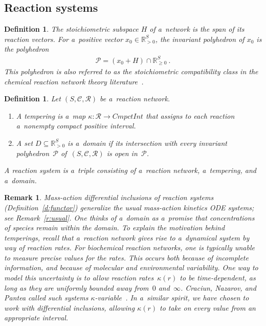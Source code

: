 \documentclass[pdftex]{sigma}
\newtheorem{Definition}[Theorem]{Definition}
\newtheorem{Remark}[Theorem]{Remark}
\begin{document}
\subsection{Reaction systems}
\label{sub:systems}
\begin{Definition}
\label{d:stoichiometry}
The \emph{stoichiometric subspace} $H$ of a~network is the span of its reaction vectors.
For a~positive vector $x_0\in\mathbb{R}_{>0}^S$, the \emph{invariant polyhedron} of $x_0$ is the polyhedron
\begin{gather}
\label{eq:scc}
\mathcal P=(x_0+H)\cap\mathbb{R}_{\geq 0}^S~.
\end{gather}
This polyhedron is also referred to as the \emph{stoichiometric compatibility class} in the chemical reaction network
theory literature~\cite{Fein79}.
\end{Definition}
\begin{Definition}
Let $(S,\mathcal C,\mathcal R)$ be a~reaction network.
\begin{enumerate}\itemsep=0pt
\item A \emph{tempering} is a~map $\kappa:\mathcal R\rightarrow\mathit{CmpctInt}$ that assigns to each reaction
a~nonempty compact positive interval.

\item A set $D\subseteq\mathbb{R}^S_{>0}$ is a~\emph{domain} if its intersection with every invariant
polyhedron~$\mathcal P$ of~$(S,\mathcal C,\mathcal R)$ is open in~$\mathcal P$.
\end{enumerate}
A \emph{reaction system} is a~triple consisting of a~reaction network, a~tempering, and a~domain.
\end{Definition}
\begin{Remark}\label{r:tempered}
Mass-action dif\/ferential inclusions of reaction systems (Def\/inition~\ref{d:functor}) ge\-ne\-ra\-li\-ze the usual
mass-action kinetics ODE systems; see Remark~\ref{r:usual}.
One thinks of a~domain as a~promise that concentrations of species remain within the domain.
To explain the motivation behind temperings, recall that a~reaction network gives rise to a~dynamical system by way of
reaction rates.
For biochemical reaction networks, one is typically unable to measure precise values for the rates.
This occurs both because of incomplete information, and because of molecular and environmental variability.
One way to model this uncertainty is to allow reaction rates~$\kappa(r)$ to be time-dependent, as long as they are
uniformly bounded away from~$0$ and~$\infty$.
Craciun, Nazarov, and Pantea called such systems $\kappa$-variable~\cite{CNP}.
In a~similar spirit, we have chosen to work with dif\/ferential inclusions, allowing $\kappa(r)$ to take on every value
from an appropriate interval.
\end{Remark}
\end{document}
